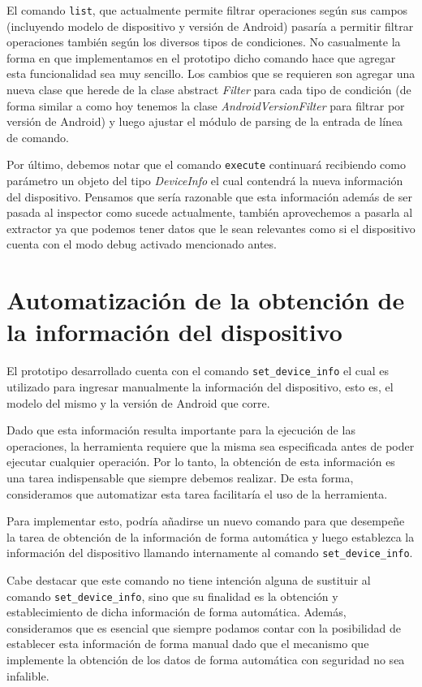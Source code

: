 El comando \texttt{list}, que actualmente permite filtrar operaciones según sus campos (incluyendo modelo de dispositivo y versión de Android) pasaría a permitir filtrar operaciones también según los diversos tipos de condiciones. No casualmente la forma en que implementamos en el prototipo dicho comando hace que agregar esta funcionalidad sea muy sencillo. Los cambios que se requieren son agregar una nueva clase que herede de la clase abstract \emph{Filter} para cada tipo de condición (de forma similar a como hoy tenemos la clase \emph{AndroidVersionFilter} para filtrar por versión de Android) y luego ajustar el módulo de parsing de la entrada de línea de comando.

Por último, debemos notar que el comando \texttt{execute} continuará recibiendo como parámetro un objeto del tipo \emph{DeviceInfo} el cual contendrá la nueva información del dispositivo. Pensamos que sería razonable que esta información además de ser pasada al inspector como sucede actualmente, también aprovechemos a pasarla al extractor ya que podemos tener datos que le sean relevantes como si el dispositivo cuenta con el modo debug activado mencionado antes.


\section{Automatización de la obtención de la información del dispositivo}
El prototipo desarrollado cuenta con el comando \texttt{set\_device\_info} el cual es utilizado para ingresar manualmente la información del dispositivo, esto es, el modelo del mismo y la versión de Android que corre.

Dado que esta información resulta importante para la ejecución de las operaciones, la herramienta requiere que la misma sea especificada antes de poder ejecutar cualquier operación. Por lo tanto, la obtención de esta información es una tarea indispensable que siempre debemos realizar. De esta forma, consideramos que automatizar esta tarea facilitaría el uso de la herramienta.

Para implementar esto, podría añadirse un nuevo comando para que desempeñe la tarea de obtención de la información de forma automática y luego establezca la información del dispositivo llamando internamente al comando \texttt{set\_device\_info}.

Cabe destacar que este comando no tiene intención alguna de sustituir al comando \texttt{set\_device\_info}, sino que su finalidad es la obtención y establecimiento de dicha información de forma automática. Además, consideramos que es esencial que siempre podamos contar con la posibilidad de establecer esta información de forma manual dado que el mecanismo que implemente la obtención de los datos de forma automática con seguridad no sea infalible.


